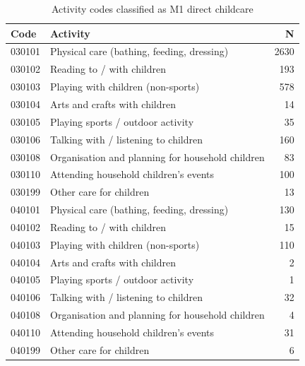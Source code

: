 \begin{table}[ht]
\centering
\begin{tabular}{llr}
  \toprule
Code & Activity & N \\ 
  \midrule
030101 & Physical care (bathing, feeding, dressing) & 2630 \\ 
  030102 & Reading to / with children & 193 \\ 
  030103 & Playing with children (non-sports) & 578 \\ 
  030104 & Arts and crafts with children &  14 \\ 
  030105 & Playing sports / outdoor activity &  35 \\ 
  030106 & Talking with / listening to children & 160 \\ 
  030108 & Organisation and planning for household children &  83 \\ 
  030110 & Attending household children's events & 100 \\ 
  030199 & Other care for children &  13 \\ 
  040101 & Physical care (bathing, feeding, dressing) & 130 \\ 
  040102 & Reading to / with children &  15 \\ 
  040103 & Playing with children (non-sports) & 110 \\ 
  040104 & Arts and crafts with children &   2 \\ 
  040105 & Playing sports / outdoor activity &   1 \\ 
  040106 & Talking with / listening to children &  32 \\ 
  040108 & Organisation and planning for household children &   4 \\ 
  040110 & Attending household children's events &  31 \\ 
  040199 & Other care for children &   6 \\ 
   \bottomrule
\end{tabular}
\caption{Activity codes classified as M1 direct childcare} 
\label{tab:m1_codes}
\end{table}
